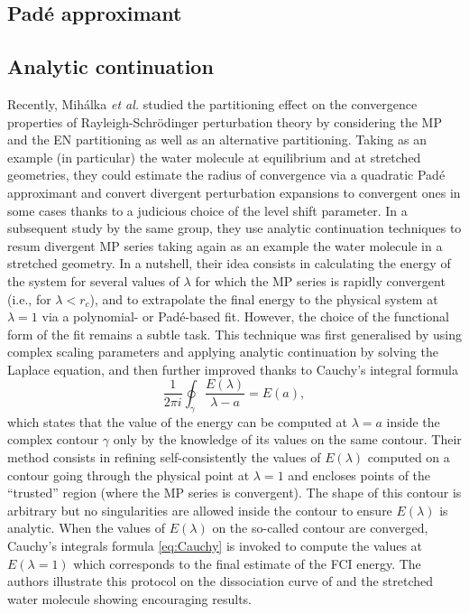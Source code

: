 \documentclass[aps,prb,reprint,noshowkeys,linenumbers,superscriptaddress]{revtex4-1}
\newcommand{\latin}[1]{#1}
\newcommand{\ie}{\latin{i.e.}}
\begin{document}
\subsection{Pad\'e approximant}


\subsection{Analytic continuation}

Recently, Mih\'alka \textit{et al.} studied the partitioning effect on the convergence properties of Rayleigh-Schr\"odinger perturbation theory by considering the MP and the EN partitioning as well as an alternative partitioning. \cite{Mihalka_2017a} 
Taking as an example (in particular) the water molecule at equilibrium and at stretched geometries, they could estimate the radius of convergence via a quadratic Pad\'e approximant and convert divergent perturbation expansions to convergent ones in some cases thanks to a judicious choice of the level shift parameter.
In a subsequent study by the same group, \cite{Mihalka_2017b} they use analytic continuation techniques to resum divergent MP series \cite{Goodson_2011} taking again as an example the water molecule in a stretched geometry.
In a nutshell, their idea consists in calculating the energy of the system for several values of $\lambda$ for which the MP series is rapidly convergent (\ie, for $\lambda < r_c$), and to extrapolate the final energy to the physical system at $\lambda = 1$ via a polynomial- or Pad\'e-based fit. 
However, the choice of the functional form of the fit remains a subtle task.
This technique was first generalised by using complex scaling parameters and applying analytic continuation by solving the Laplace equation, \cite{Surjan_2018} and then further improved thanks to Cauchy's integral formula \cite{Mihalka_2019}
\begin{equation}
	\label{eq:Cauchy}
	\frac{1}{2\pi i} \oint_{\gamma} \frac{E(\lambda)}{\lambda - a} = E(a),
\end{equation}
which states that the value of the energy can be computed at $\lambda=a$ inside the complex contour $\gamma$ only by the knowledge of its values on the same contour.
Their method consists in refining self-consistently the values of $E(\lambda)$ computed on a contour going through the physical point at $\lambda = 1$ and encloses points of the ``trusted'' region (where the MP series is convergent). The shape of this contour is arbitrary but no singularities are allowed inside the contour to ensure $E(\lambda)$ is analytic. 
When the values of $E(\lambda)$ on the so-called contour are converged, Cauchy's integrals formula \eqref{eq:Cauchy} is invoked to compute the values at $E(\lambda=1)$ which corresponds to the final estimate of the FCI energy.
The authors illustrate this protocol on the dissociation curve of  and the stretched water molecule showing encouraging results. \cite{Mihalka_2019} 
\end{document}
